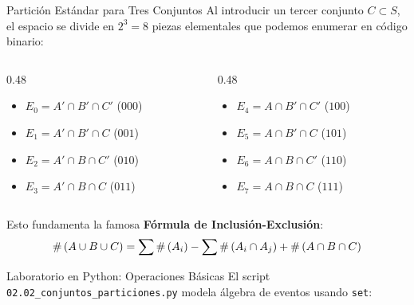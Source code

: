 \documentclass[10pt,aspectratio=169]{beamer}
\begin{document}
\begin{frame}{Partición Estándar para Tres Conjuntos}
  Al introducir un tercer conjunto $C \subset S$, el espacio se divide en $2^3 = 8$ piezas elementales que podemos enumerar en código binario:
  
  \vspace{0.2em}
  \begin{columns}[T]
    \begin{column}{0.48\textwidth}
      \small
      \begin{itemize}
        \item $E_0 = A' \cap B' \cap C'$ \quad ($000$)
        \item $E_1 = A' \cap B' \cap C$ \quad ($001$)
        \item $E_2 = A' \cap B \cap C'$ \quad ($010$)
        \item $E_3 = A' \cap B \cap C$ \quad ($011$)
      \end{itemize}
    \end{column}
    \begin{column}{0.48\textwidth}
      \small
      \begin{itemize}
        \item $E_4 = A \cap B' \cap C'$ \quad ($100$)
        \item $E_5 = A \cap B' \cap C$ \quad ($101$)
        \item $E_6 = A \cap B \cap C'$ \quad ($110$)
        \item $E_7 = A \cap B \cap C$ \quad ($111$)
      \end{itemize}
    \end{column}
  \end{columns}
  
  \vspace{0.3em}
  \pause
  \begin{center}
    \small Esto fundamenta la famosa \textbf{Fórmula de Inclusión-Exclusión}:
    \[ \#\left( A \cup B \cup C \right) = \sum \#\left( A_i \right) - \sum \#\left( A_i \cap A_j \right) + \#\left( A \cap B \cap C \right) \]
  \end{center}
\end{frame}

\begin{frame}[fragile]{Laboratorio en Python: Operaciones Básicas}
  El script \texttt{02.02\_conjuntos\_particiones.py} modela álgebra de eventos usando \texttt{set}:
  \vspace{0.2em}
  {
  }
\end{frame}
\end{document}
